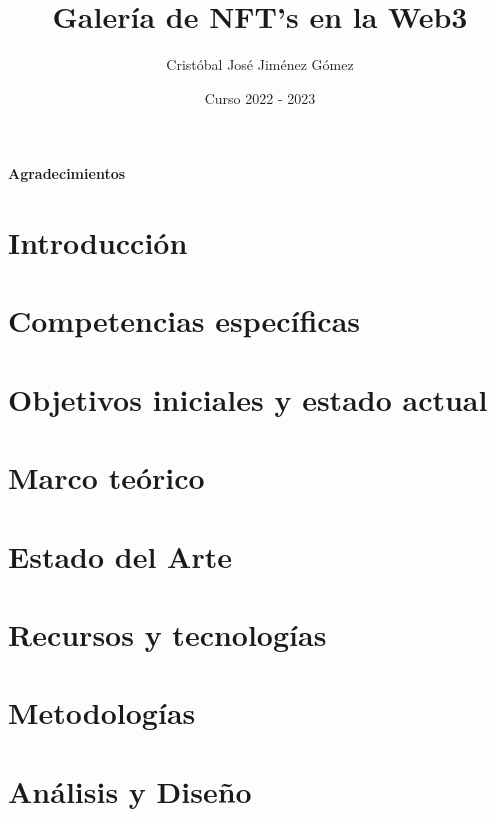 \documentclass[oneside,12pt]{book}
\title{Galería de NFT's en la Web3}
\author{Cristóbal José Jiménez Gómez}
\date{Curso 2022 - 2023}
\begin{document}


%

\newpage
{}
{\Large{\textbf{Agradecimientos}}}


\clearpage

\tableofcontents
\newpage
\listoffigures
\newpage
\listoftables

\clearpage
{}

\chapter{Introducción}

\newpage
\chapter{Competencias específicas}

\newpage
\chapter{Objetivos iniciales y estado actual}

\newpage
\chapter{Marco teórico}

\newpage

\chapter{Estado del Arte}

\newpage
\chapter{Recursos y tecnologías}

\newpage
\chapter{Metodologías}
\newpage
\chapter{Análisis y Diseño}
\newpage
\end{document}
